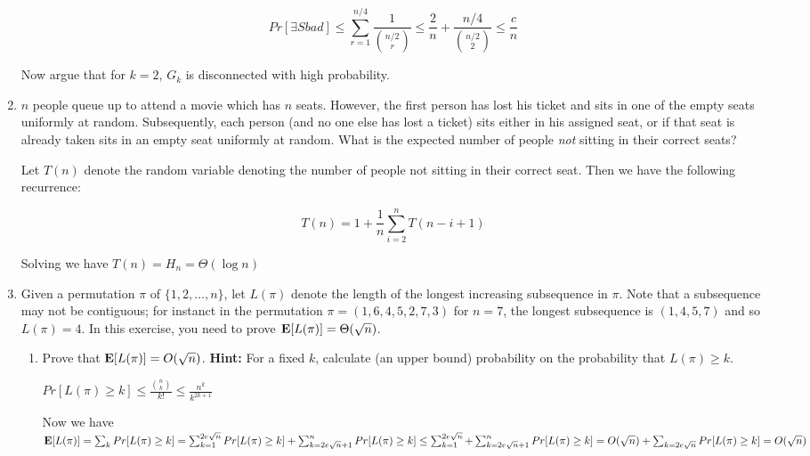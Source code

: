 \documentclass[11pt]{article}
\begin{document}
\begin{enumerate}
              \[ Pr[\exists S bad] \le \sum_{r=1}^{n/4}\frac{1}{{n/2 \choose r}} \le \frac{2}{n} + \frac{n/4}{{n/2 \choose 2}} \le \frac{c}{n} \]
              
              Now argue that for $k=2$, $G_k$ is disconnected with high probability.
	          
	 \item $n$ people queue up to attend a movie which has $n$ seats. However, the first person has lost his ticket and sits in one of the empty seats uniformly at random. Subsequently, each person (and no one else has lost a ticket) sits either in his assigned seat, or if that seat is already taken sits in an empty seat uniformly at random. What is the expected number of people {\em not} sitting in their correct seats?
	 
	 \Sol Let $T(n)$ denote the random variable denoting the number of people not sitting in their correct seat. Then we have the following recurrence:
	 
	 \[T(n) = 1 + \frac{1}{n}\sum_{i=2}^n T(n-i+1)\]
	 
	 Solving we have $T(n) = H_n = \Theta(\log n)$
	         
	  \item Given a permutation $\pi$ of $\{1,2,\ldots,n\}$, let $L(\pi)$ denote the length of the longest increasing subsequence in $\pi$. Note that a subsequence may not be contiguous; for instanct in the permutation $\pi = (1,6,4,5,2,7,3)$ for $n=7$, the longest subsequence is $(1,4,5,7)$ and so $L(\pi) = 4$. In this exercise, you need to prove $\hbox{\bf E}[L(\pi)] = \Theta(\sqrt{n})$. 
	  \begin{enumerate}
	  	\item Prove that $\hbox{\bf E}[L(\pi)] = O(\sqrt{n})$. {\bf Hint:} For a fixed $k$, calculate (an upper bound) probability on the probability that $L(\pi) \geq k$. 
	  	
	  	\Sol
	  	
	  	$Pr[L(\pi) \geq k] \le \frac{{n\choose k}}{k!} \le \frac{n^k}{k^{2k+1}}$
	  	
	  	Now we have $\hbox{\bf E}[L(\pi)] = \sum_k Pr[L(\pi) \geq k] = \sum_{k=1}^{2e\sqrt{n}} Pr[L(\pi) \geq k] + \sum_{k = 2e\sqrt{n} + 1}^n Pr[L(\pi) \geq k] \le \sum_{k=1}^{2e\sqrt{n}} + \sum_{k = 2e\sqrt{n} + 1}^n Pr[L(\pi) \geq k] =  O(\sqrt{n}) + \sum_{k=2e\sqrt{n}} Pr[L(\pi) \geq k] = O(\sqrt{n})$
        

\end{enumerate}
\end{enumerate}
\end{document}

